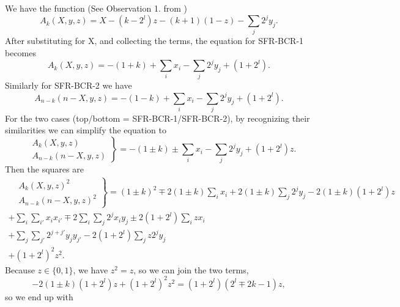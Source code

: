 \documentclass[a4paper,english,notitlepage,longbibliography,showpacs,preprintnumbers,amsmath,amssymb,aps,prx,nofootinbib,12pt,superscriptaddress]{revtex4-1}
\begin{document}
\noindent We have the function (See Observation 1. from \cite{Boros2018QuadratizationsOS}) %
\begin{equation}
\label{eq:Ak}
A_k(X,y,z) = X - (k-2^l)z - (k+1)(1-z) - \sum_{j}2^jy_j.
\end{equation}
After substituting for X, and collecting the terms, the equation for SFR-BCR-1 becomes
\begin{equation}
\label{eq:Ak1}
A_k(X,y,z) = -(1+k) +\sum_i x_i - \sum_{j}2^jy_j + (1+2^l).
\end{equation}
Similarly for SFR-BCR-2 we have
\begin{equation}
\label{eq:Ak2}
A_{n-k}({n-X},y,z) = -(1-k) +\sum_i x_i - \sum_{j}2^jy_j + (1+2^l).
\end{equation}
For the  two cases
(top/bottom = SFR-BCR-1/SFR-BCR-2),
by recognizing their similarities we can simplify the equation to
\begin{equation}
\label{eq:Ak12}
\left.\begin{aligned}
&A_k(X,y,z) \\
&A_{n-k}({n-X},y,z)
\end{aligned}\right\}
= -(1\pm k) \pm \sum_i x_i - \sum_j 2^jy_j + (1+2^l)z.
\end{equation}
Then the squares are
\begin{equation}
\label{eq:Ak12sq}
\begin{split}
\left.\begin{aligned}
&A_k(X,y,z)^2 \\
&A_{n-k}({n-X},y,z)^2
\end{aligned}\right\}
= (1\pm k)^2 \mp2(1\pm k)\sum_i x_i +2(1\pm k)\sum_j 2^jy_j -2(1\pm k)(1+2^l)z & \\
+ \sum_i\sum_{i'} x_ix_{i'} \mp2\sum_i\sum_j 2^jx_iy_j \pm2 (1+2^l)\sum_i zx_i & \\
+ \sum_j\sum_{j'} 2^{j+j'}y_jy_{j'} - 2(1+2^l)\sum_j z 2^jy_j & \\
+ (1+2^l)^2z^2. &
\end{split}
\end{equation}
Because $z\in\{0,1\}$, we have $z^2=z$, so we can join the two terms,
\begin{equation}
-2(1\pm k)(1+2^l)z + (1+2^l)^2z^2 = (1+2^l)(2^l\mp2k-1)z,
\end{equation}
so we end up with
\end{document}
